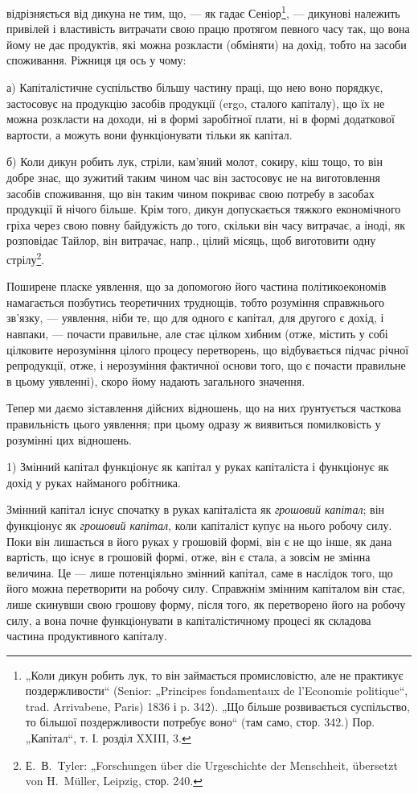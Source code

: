 \parcont{}  %
відрізняється від дикуна не тим, що, — як гадає Сеніор\footnote{
„Коли дикун робить лук, то він займається промисловістю, але не практикує
поздержливости“ (Senior: „Principes fondamentaux de l’Economie politique“,
trad. Arrivabene, Paris) 1836 і p. 342). „Що більше розвивається суспільство, то
більшої поздержливости потребує воно“ (там само, стор. 342.) Пор. „Капітал“,
т. І. розділ XXIII, 3.
}, — дикунові
належить привілей і властивість витрачати свою працю протягом певного
часу так, що вона йому не дає продуктів, які можна розкласти (обміняти)
на дохід, тобто на засоби споживання. Ріжниця ця ось у чому:

а) Капіталістичне суспільство більшу частину праці, що нею воно
порядкує, застосовує на продукцію засобів продукції (ergo, сталого
капіталу), що їх не можна розкласти на доходи, ні в формі заробітної
плати, ні в формі додаткової вартости, а можуть вони функціонувати
тільки як капітал.

б) Коли дикун робить лук, стріли, кам’яний молот, сокиру, кіш тощо,
то він добре знає, що зужитий таким чином час він застосовує не на
виготовлення засобів споживання, що він таким чином покриває свою
потребу в засобах продукції й нічого більше. Крім того, дикун допускається
тяжкого економічного гріха через свою повну байдужість до того,
скільки він часу витрачає, а іноді, як розповідає Тайлор, він витрачає,
напр., цілий місяць, щоб виготовити одну стрілу\footnote{
Е.~В.~Tyler: „Forschungen über die Urgeschichte der Menschheit, übersetzt
von H.~Müller, Leipzig, стор. 240.
}.

Поширене пласке уявлення, що за допомогою його частина політикоекономів
намагається позбутись теоретичних труднощів, тобто розуміння
справжнього зв’язку, — уявлення, ніби те, що для одного є капітал, для
другого є дохід, і навпаки, — почасти правильне, але стає цілком хибним
(отже, містить у собі цілковите нерозуміння цілого процесу перетворень,
що відбувається підчас річної репродукції, отже, і нерозуміння фактичної
основи того, що є почасти правильне в цьому уявленні), скоро йому
надають загального значення.

Тепер ми даємо зіставлення дійсних відношень, що на них ґрунтується
часткова правильність цього уявлення; при цьому одразу ж виявиться
помилковість у розумінні цих відношень.

1) Змінний капітал функціонує як капітал у руках капіталіста і функціонує
як дохід у руках найманого робітника.

Змінний капітал існує спочатку в руках капіталіста як \emph{грошовий
капітал}; він функціонує як \emph{грошовий капітал}, коли капіталіст
купує на нього робочу силу. Поки він лишається в його руках у грошовій
формі, він є не що інше, як дана вартість, що існує в грошовій
формі, отже, він є стала, а зовсім не змінна величина. Це — лише потенціяльно
змінний капітал, саме в наслідок того, що його можна перетворити
на робочу силу. Справжнім змінним капіталом він стає, лише скинувши
свою грошову форму, після того, як перетворено його на робочу
силу, а вона почне функціонувати в капіталістичному процесі як складова
частина продуктивного капіталу.
